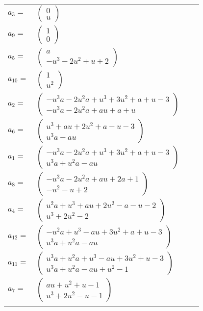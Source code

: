 \documentclass[1p]{elsarticle_modified}
\theoremstyle{definition}
\begin{document}
\begin{tabular}{m{7pt} m{180pt} m{7pt} m{180pt} }
\flushright $a_{3}=$&$\begin{pmatrix}0\\u\end{pmatrix}$ \\
\flushright $a_{9}=$&$\begin{pmatrix}1\\0\end{pmatrix}$ \\
\flushright $a_{5}=$&$\begin{pmatrix}a\\- u^3-2 u^2+u+2\end{pmatrix}$ \\
\flushright $a_{10}=$&$\begin{pmatrix}1\\u^2\end{pmatrix}$ \\
\flushright $a_{2}=$&$\begin{pmatrix}- u^3 a-2 u^2 a+u^3+3 u^2+a+u-3\\- u^3 a-2 u^2 a+a u+a+u\end{pmatrix}$ \\
\flushright $a_{6}=$&$\begin{pmatrix}u^3+a u+2 u^2+a- u-3\\u^3 a- a u\end{pmatrix}$ \\
\flushright $a_{1}=$&$\begin{pmatrix}- u^3 a-2 u^2 a+u^3+3 u^2+a+u-3\\u^3 a+u^2 a- a u\end{pmatrix}$ \\
\flushright $a_{8}=$&$\begin{pmatrix}- u^3 a-2 u^2 a+a u+2 a+1\\- u^2- u+2\end{pmatrix}$ \\
\flushright $a_{4}=$&$\begin{pmatrix}u^2 a+u^3+a u+2 u^2- a- u-2\\u^3+2 u^2-2\end{pmatrix}$ \\
\flushright $a_{12}=$&$\begin{pmatrix}- u^2 a+u^3- a u+3 u^2+a+u-3\\u^3 a+u^2 a- a u\end{pmatrix}$ \\
\flushright $a_{11}=$&$\begin{pmatrix}u^3 a+u^2 a+u^3- a u+3 u^2+u-3\\u^3 a+u^2 a- a u+u^2-1\end{pmatrix}$ \\
\flushright $a_{7}=$&$\begin{pmatrix}a u+u^2+u-1\\u^3+2 u^2- u-1\end{pmatrix}$\\&\end{tabular}
\end{document}
